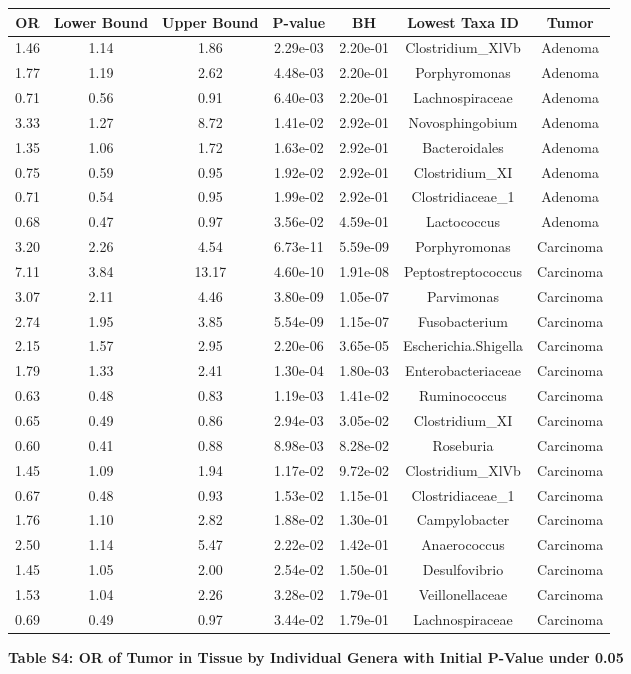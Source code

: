 \documentclass[12pt,]{article}
\begin{document}
\begin{longtable}[]{@{}ccccccc@{}}
\toprule
OR & Lower Bound & Upper Bound & P-value & BH & Lowest Taxa ID &
Tumor\tabularnewline
\midrule
\endhead
1.46 & 1.14 & 1.86 & 2.29e-03 & 2.20e-01 & Clostridium\_XlVb &
Adenoma\tabularnewline
1.77 & 1.19 & 2.62 & 4.48e-03 & 2.20e-01 & Porphyromonas &
Adenoma\tabularnewline
0.71 & 0.56 & 0.91 & 6.40e-03 & 2.20e-01 & Lachnospiraceae &
Adenoma\tabularnewline
3.33 & 1.27 & 8.72 & 1.41e-02 & 2.92e-01 & Novosphingobium &
Adenoma\tabularnewline
1.35 & 1.06 & 1.72 & 1.63e-02 & 2.92e-01 & Bacteroidales &
Adenoma\tabularnewline
0.75 & 0.59 & 0.95 & 1.92e-02 & 2.92e-01 & Clostridium\_XI &
Adenoma\tabularnewline
0.71 & 0.54 & 0.95 & 1.99e-02 & 2.92e-01 & Clostridiaceae\_1 &
Adenoma\tabularnewline
0.68 & 0.47 & 0.97 & 3.56e-02 & 4.59e-01 & Lactococcus &
Adenoma\tabularnewline
3.20 & 2.26 & 4.54 & 6.73e-11 & 5.59e-09 & Porphyromonas &
Carcinoma\tabularnewline
7.11 & 3.84 & 13.17 & 4.60e-10 & 1.91e-08 & Peptostreptococcus &
Carcinoma\tabularnewline
3.07 & 2.11 & 4.46 & 3.80e-09 & 1.05e-07 & Parvimonas &
Carcinoma\tabularnewline
2.74 & 1.95 & 3.85 & 5.54e-09 & 1.15e-07 & Fusobacterium &
Carcinoma\tabularnewline
2.15 & 1.57 & 2.95 & 2.20e-06 & 3.65e-05 & Escherichia.Shigella &
Carcinoma\tabularnewline
1.79 & 1.33 & 2.41 & 1.30e-04 & 1.80e-03 & Enterobacteriaceae &
Carcinoma\tabularnewline
0.63 & 0.48 & 0.83 & 1.19e-03 & 1.41e-02 & Ruminococcus &
Carcinoma\tabularnewline
0.65 & 0.49 & 0.86 & 2.94e-03 & 3.05e-02 & Clostridium\_XI &
Carcinoma\tabularnewline
0.60 & 0.41 & 0.88 & 8.98e-03 & 8.28e-02 & Roseburia &
Carcinoma\tabularnewline
1.45 & 1.09 & 1.94 & 1.17e-02 & 9.72e-02 & Clostridium\_XlVb &
Carcinoma\tabularnewline
0.67 & 0.48 & 0.93 & 1.53e-02 & 1.15e-01 & Clostridiaceae\_1 &
Carcinoma\tabularnewline
1.76 & 1.10 & 2.82 & 1.88e-02 & 1.30e-01 & Campylobacter &
Carcinoma\tabularnewline
2.50 & 1.14 & 5.47 & 2.22e-02 & 1.42e-01 & Anaerococcus &
Carcinoma\tabularnewline
1.45 & 1.05 & 2.00 & 2.54e-02 & 1.50e-01 & Desulfovibrio &
Carcinoma\tabularnewline
1.53 & 1.04 & 2.26 & 3.28e-02 & 1.79e-01 & Veillonellaceae &
Carcinoma\tabularnewline
0.69 & 0.49 & 0.97 & 3.44e-02 & 1.79e-01 & Lachnospiraceae &
Carcinoma\tabularnewline
\bottomrule
\end{longtable}

\normalsize

\newpage

\textbf{Table S4: OR of Tumor in Tissue by Individual Genera with
Initial P-Value under 0.05}

\footnotesize
\end{document}
